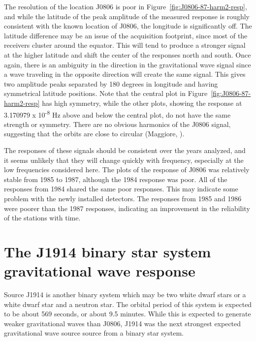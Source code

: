 
The resolution of the location J0806 is poor in Figure~\ref{fig:J0806-87-harm2-resp},
 and while the latitude of the peak amplitude of the measured response is roughly consistent with the known location of J0806, the longitude is significantly off.
The latitude difference may be an issue of the acquisition footprint, since most of the receivers cluster around the equator. This will tend to produce a stronger signal at the higher latitude and shift the center of the responses north and south.  Once again, there is an ambiguity in the direction in the gravitational wave signal since a wave traveling in the opposite direction will create the same signal.  This gives two amplitude peaks separated by 180 degrees in longitude and having symmetrical latitude positions.  Note that the central plot in Figure~\ref{fig:J0806-87-harm2-resp} has high symmetry, while the other plots, showing the response at 3.170979 x 10\textsuperscript{-8} Hz above and below the central plot, do not have the same strength or symmetry.
There are no obvious harmonics of the J0806 signal, suggesting that the orbits are 
close to circular (Maggiore, \citeyear{Maggiore}).

The responses of these signals should be consistent over the years analyzed, and it seems unlikely that they will change quickly with frequency, 
especially at the low frequencies considered here.  The plots of the response of J0806 was relatively stable from 1985 to 1987, although the 1984 response was poor.  All of the responses from 1984 shared the same poor responses.  This may indicate some problem with the newly installed detectors.  The responses from 1985 and 1986 were poorer than the 1987 responses, indicating an improvement in the reliability of the stations with time.  


\section{The J1914 binary star system gravitational wave response}

Source J1914 is another binary system which may be two white dwarf stars or a white dwarf star and a neutron star.  
The orbital period of this system is expected to be about 569 seconds, 
or about 9.5 minutes.
While this is expected to generate weaker gravitational waves than J0806,
J1914 was the next strongest expected gravitational wave source  source from a binary star system.

